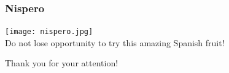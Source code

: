 \documentclass{beamer}
\begin{document}




\begin{frame}
\frametitle{Nispero}
\hspace{0.2\textwidth}
\texttt{[image: nispero.jpg]}
\hspace{0.2\textwidth}
\\
Do not lose opportunity to try this amazing Spanish fruit!
\end{frame}







\begin{frame}
\Huge{\centerline{Thank you for your attention!}}
\end{frame}
\end{document}

